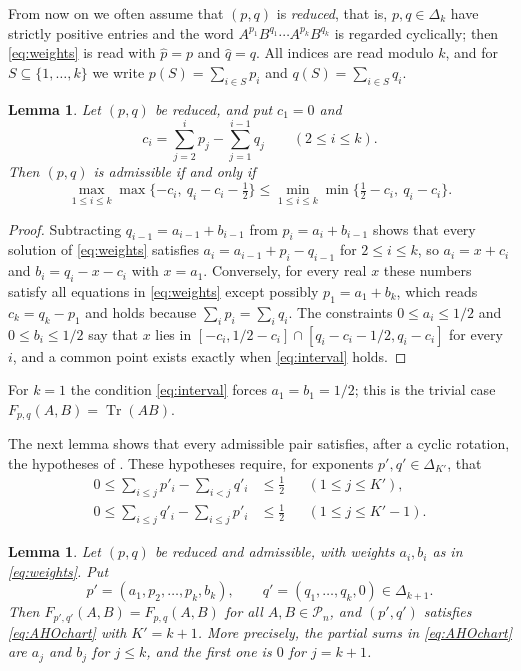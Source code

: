 \documentclass{amsart}
\newtheorem{lemma}[theorem]{Lemma}
\theoremstyle{definition}
\theoremstyle{remark}
\numberwithin{equation}{section}
\newcommand{\Tr}{\operatorname{Tr}}
\newcommand{\PSD}{\mathcal{P}_n}
\begin{document}
From now on we often assume that $(p,q)$ is \emph{reduced}, that is, $p,q\in\Delta_k$ have strictly positive entries and the word $A^{p_1}B^{q_1}\cdots A^{p_k}B^{q_k}$ is regarded cyclically; then \eqref{eq:weights} is read with $\hat p=p$ and $\hat q=q$. All indices are read modulo $k$, and for $S\subseteq\{1,\dots,k\}$ we write $p(S)=\sum_{i\in S}p_i$ and $q(S)=\sum_{i\in S}q_i$.

\begin{lemma}\label{lem:interval}
Let $(p,q)$ be reduced, and put $c_1=0$ and
\[
c_i=\sum_{j=2}^{i}p_j-\sum_{j=1}^{i-1}q_j\qquad(2\le i\le k).
\]
Then $(p,q)$ is admissible if and only if
\begin{equation}\label{eq:interval}
\max_{1\le i\le k}\max\{-c_i,\ q_i-c_i-\tfrac12\}\le\min_{1\le i\le k}\min\{\tfrac12-c_i,\ q_i-c_i\}.
\end{equation}
\end{lemma}

\begin{proof}
Subtracting $q_{i-1}=a_{i-1}+b_{i-1}$ from $p_i=a_i+b_{i-1}$ shows that every solution of \eqref{eq:weights} satisfies $a_i=a_{i-1}+p_i-q_{i-1}$ for $2\le i\le k$, so $a_i=x+c_i$ and $b_i=q_i-x-c_i$ with $x=a_1$. Conversely, for every real $x$ these numbers satisfy all equations in \eqref{eq:weights} except possibly $p_1=a_1+b_k$, which reads $c_k=q_k-p_1$ and holds because $\sum_ip_i=\sum_iq_i$. The constraints $0\le a_i\le 1/2$ and $0\le b_i\le 1/2$ say that $x$ lies in $[-c_i,1/2-c_i]\cap[q_i-c_i-1/2,q_i-c_i]$ for every $i$, and a common point exists exactly when \eqref{eq:interval} holds.
\end{proof}

For $k=1$ the condition \eqref{eq:interval} forces $a_1=b_1=1/2$; this is the trivial case $F_{p,q}(A,B)=\Tr(AB)$.

The next lemma shows that every admissible pair satisfies, after a cyclic rotation, the hypotheses of \cite[Theorem~2.1]{AHO}. These hypotheses require, for exponents $p',q'\in\Delta_{K'}$, that
\begin{equation}\label{eq:AHOchart}
\begin{aligned}
0\le\sum_{i\le j}p'_i-\sum_{i<j}q'_i&\le\tfrac12&&(1\le j\le K'),\\
0\le\sum_{i\le j}q'_i-\sum_{i\le j}p'_i&\le\tfrac12&&(1\le j\le K'-1).
\end{aligned}
\end{equation}

\begin{lemma}\label{lem:chart}
Let $(p,q)$ be reduced and admissible, with weights $a_i,b_i$ as in \eqref{eq:weights}. Put
\[
p'=(a_1,p_2,\dots,p_k,b_k),\qquad q'=(q_1,\dots,q_k,0)\in\Delta_{k+1}.
\]
Then $F_{p',q'}(A,B)=F_{p,q}(A,B)$ for all $A,B\in\PSD$, and $(p',q')$ satisfies \eqref{eq:AHOchart} with $K'=k+1$. More precisely, the partial sums in \eqref{eq:AHOchart} are $a_j$ and $b_j$ for $j\le k$, and the first one is $0$ for $j=k+1$.
\end{lemma}
\end{document}
